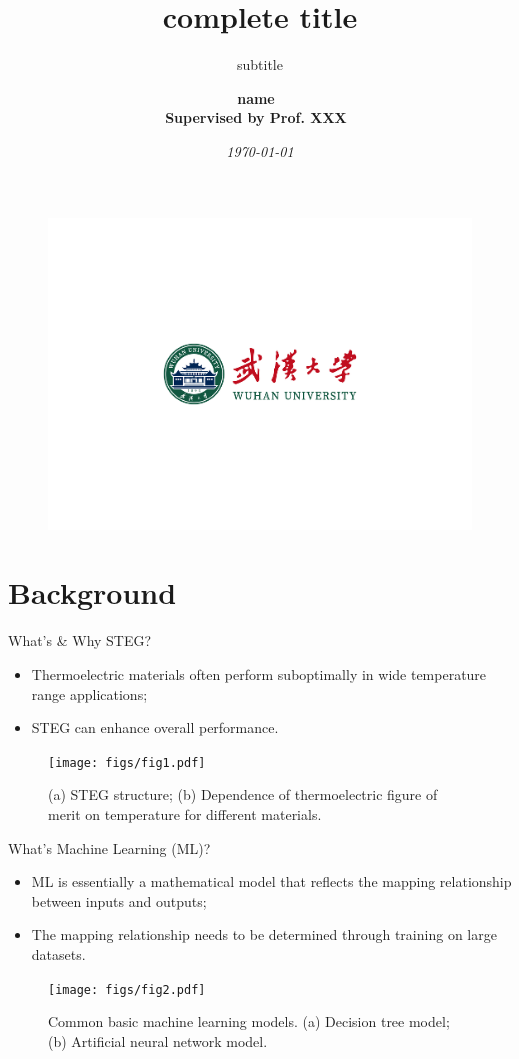 \documentclass{beamer}
\author[brief name]{\textbf{
    name~\orcidlink{0000-1111-2222-3333}\\
    Supervised by Prof. XXX~\orcidlink{3333-4444-5555-6666}
}}
\title[brief title]{\textbf{complete title}}
\subtitle{subtitle}
\institute{Your Institution}
\date{\textit{\today}}
\begin{document}
\begin{frame}
    \titlepage
    \begin{figure}[htpb]
        \begin{center}
            \includegraphics[width=0.35\linewidth]{pic/dark.pdf}
        \end{center}
    \end{figure}
\end{frame}

\begin{frame}
    \tableofcontents[sectionstyle=show,subsectionstyle=show/shaded/hide,subsubsectionstyle=show/shaded/hide]
\end{frame}


\section{Background}

\begin{frame}{What's \& Why STEG?}
    \small

	\begin{itemize}
		\item {
			Thermoelectric materials often perform suboptimally in wide temperature range applications;
		}
		\item {
			STEG can enhance overall performance.
		}
	\end{itemize}

	\begin{figure}
		\centering
		\texttt{[image: figs/fig1.pdf]}
		\captionsetup{font=small}
        \caption{(a) STEG structure; (b) Dependence of thermoelectric figure of merit on temperature for different materials.}
		\label{fig1}
	\end{figure}

\end{frame}


\begin{frame}{What's Machine Learning (ML)?}
    \small
	\begin{itemize}
		\item {
			ML is essentially a mathematical model that reflects the mapping relationship between inputs and outputs;
		}
		\item {
			The mapping relationship needs to be determined through training on large datasets.
		}
	\end{itemize}

	\begin{figure}
		\centering
		\texttt{[image: figs/fig2.pdf]}
		\caption{Common basic machine learning models. (a) Decision tree model; (b) Artificial neural network model.}
		\label{fig2}
	\end{figure}
\end{frame}
\end{document}
